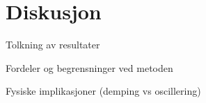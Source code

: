 \section{Diskusjon}
Tolkning av resultater

Fordeler og begrensninger ved metoden

Fysiske implikasjoner (demping vs oscillering)
